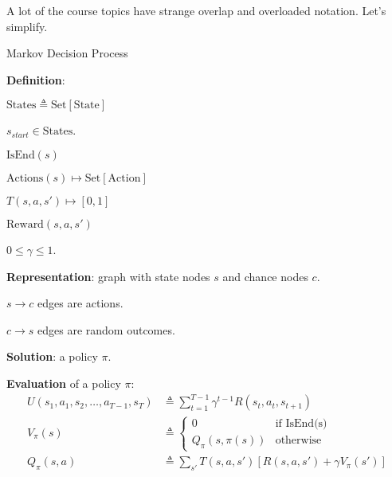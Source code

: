 \documentclass[11pt]{article}
\begin{document}

A lot of the course topics have strange overlap and overloaded notation. Let's simplify.


\begin{itemdefinition}{Markov Decision Process}
	\item \textbf{Definition}:
	\begin{compactitem}
		\item $\text{States} \triangleq  \text{Set}[\text{State}]$
		\begin{compactitem}
			\item $s_{start} \in \text{States}$.
			\item $\text{IsEnd}(s)$
		\end{compactitem}
		\item $\text{Actions}(s) \mapsto \text{Set}[\text{Action}]$
		\item $T(s, a, s') \mapsto [0, 1]$
		\item $\text{Reward}(s, a, s')$
		\item $0 \le \gamma \le 1$. 
	\end{compactitem}

	\item \textbf{Representation}: graph with state nodes $s$ and chance nodes $c$.
	\begin{compactitem}
		\item $s{\rightarrow}c$ edges are actions.
		\item $c{\rightarrow}s$ edges are random outcomes. 
	\end{compactitem} 

	\item \textbf{Solution}: a policy $\pi$. 
	
	\item \textbf{Evaluation} of a policy $\pi$: 
	\begin{align}
		U(s_{1}, a_1, s_2, \ldots, a_{T - 1}, s_{T})
			&\triangleq  \sum_{t=1}^{T - 1} \gamma^{t - 1} R(s_t, a_t, s_{t+1}) \\
		V_{\pi}(s)
			&\triangleq \begin{cases}
			0 & \text{if IsEnd(s)} \\
			Q_{\pi}(s, \pi(s)) & \text{otherwise}
			\end{cases} \\
		Q_{\pi}(s, a)
			&\triangleq \sum_{s'} T(s, a, s')\left[
			R(s, a, s') + \gamma V_\pi(s')
			\right] 
	\end{align}
\end{itemdefinition}
\end{document}
